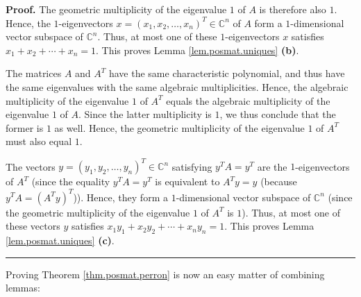 \documentclass[numbers=enddot,12pt,final,onecolumn,notitlepage]{scrartcl}%
\numberwithin{exer}{subsection}
\theoremstyle{definition}
\newenvironment{proof}[1][Proof]{\noindent\textbf{#1.} }{\ \rule{0.5em}{0.5em}}
\begin{document}
\begin{proof}
The geometric multiplicity of the eigenvalue $1$ of $A$ is therefore also $1$.
Hence, the $1$-eigenvectors $x=\left(  x_{1},x_{2},\ldots,x_{n}\right)
^{T}\in\mathbb{C}^{n}$ of $A$ form a $1$-dimensional vector subspace of
$\mathbb{C}^{n}$. Thus, at most one of these $1$-eigenvectors $x$ satisfies
$x_{1}+x_{2}+\cdots+x_{n}=1$. This proves Lemma \ref{lem.posmat.uniques}
\textbf{(b)}.

The matrices $A$ and $A^{T}$ have the same characteristic polynomial, and thus
have the same eigenvalues with the same algebraic multiplicities. Hence, the
algebraic multiplicity of the eigenvalue $1$ of $A^{T}$ equals the algebraic
multiplicity of the eigenvalue $1$ of $A$. Since the latter multiplicity is
$1$, we thus conclude that the former is $1$ as well. Hence, the geometric
multiplicity of the eigenvalue $1$ of $A^{T}$ must also equal $1$.

The vectors $y=\left(  y_{1},y_{2},\ldots,y_{n}\right)  ^{T}\in\mathbb{C}^{n}$
satisfying $y^{T}A=y^{T}$ are the $1$-eigenvectors of $A^{T}$ (since the
equality $y^{T}A=y^{T}$ is equivalent to $A^{T}y=y$ (because $y^{T}A=\left(
A^{T}y\right)  ^{T}$)). Hence, they form a $1$-dimensional vector subspace of
$\mathbb{C}^{n}$ (since the geometric multiplicity of the eigenvalue $1$ of
$A^{T}$ is $1$). Thus, at most one of these vectors $y$ satisfies $x_{1}%
y_{1}+x_{2}y_{2}+\cdots+x_{n}y_{n}=1$. This proves Lemma
\ref{lem.posmat.uniques} \textbf{(c)}.
\end{proof}

Proving Theorem \ref{thm.posmat.perron} is now an easy matter of combining lemmas:
\end{document}

